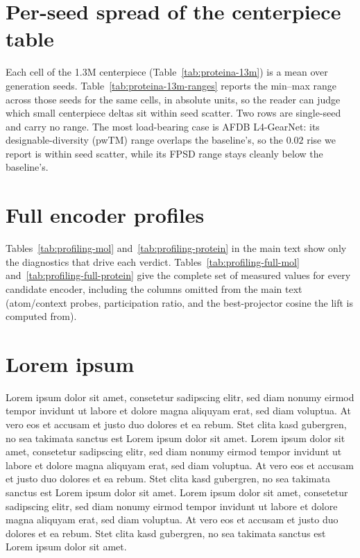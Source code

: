 \documentclass[12pt,a4paper,twoside]{report}
\begin{document}


\section{Per-seed spread of the centerpiece table}
\label{app:13m-ranges}

Each cell of the 1.3M centerpiece (Table~\ref{tab:proteina-13m}) is a mean over generation seeds. Table~\ref{tab:proteina-13m-ranges} reports the min--max range across those seeds for the same cells, in absolute units, so the reader can judge which small centerpiece deltas sit within seed scatter. Two rows are single-seed and carry no range. The most load-bearing case is AFDB L4-GearNet: its designable-diversity (pwTM) range overlaps the baseline's, so the $0.02$ rise we report is within seed scatter, while its FPSD range stays cleanly below the baseline's.



\section{Full encoder profiles}
\label{app:profiling-full}

Tables~\ref{tab:profiling-mol} and~\ref{tab:profiling-protein} in the main text show only the diagnostics that drive each verdict. Tables~\ref{tab:profiling-full-mol} and~\ref{tab:profiling-full-protein} give the complete set of measured values for every candidate encoder, including the columns omitted from the main text (atom/context probes, participation ratio, and the best-projector cosine the lift is computed from).



\iffalse
\section{Lorem ipsum}

Lorem ipsum dolor sit amet, consetetur sadipscing elitr, sed diam
nonumy eirmod tempor invidunt ut labore et dolore magna aliquyam erat,
sed diam voluptua. At vero eos et accusam et justo duo dolores et ea
rebum. Stet clita kasd gubergren, no sea takimata sanctus est Lorem
ipsum dolor sit amet. Lorem ipsum dolor sit amet, consetetur
sadipscing elitr, sed diam nonumy eirmod tempor invidunt ut labore et
dolore magna aliquyam erat, sed diam voluptua. At vero eos et accusam
et justo duo dolores et ea rebum. Stet clita kasd gubergren, no sea
takimata sanctus est Lorem ipsum dolor sit amet. Lorem ipsum dolor sit
amet, consetetur sadipscing elitr, sed diam nonumy eirmod tempor
invidunt ut labore et dolore magna aliquyam erat, sed diam voluptua.
At vero eos et accusam et justo duo dolores et ea rebum. Stet clita
kasd gubergren, no sea takimata sanctus est Lorem ipsum dolor sit
amet.
\end{document}
